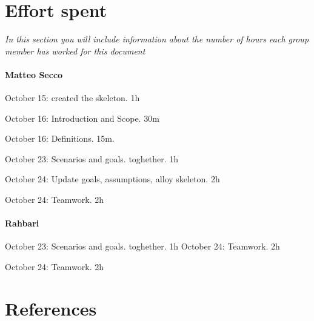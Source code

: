 \documentclass{article}
\begin{document}
\section{Effort spent} \textit{In this section you will include information about the number of hours each group member has worked for this document}
	\paragraph{Matteo Secco} 
		\begin{list}{-}{}
			\item October 15: created the skeleton. 1h
			\item October 16: Introduction and Scope. 30m
			\item October 16: Definitions. 15m.
			\item October 23: Scenarios and goals. toghether. 1h
			\item October 24: Update goals, assumptions, alloy skeleton. 2h
			\item October 24: Teamwork. 2h
		\end{list}
	\paragraph{Rahbari}
		\begin{list}{-}{}
			\item October 23: Scenarios and goals. toghether. 1h
			\ite October 24: Teamwork. 2h
			\item October 24: Teamwork. 2h
		\end{list}
\section{References}
\end{document}
